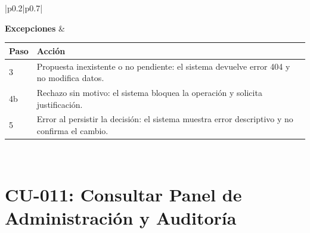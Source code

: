 \documentclass{report}
\newenvironment{usecasetable}{%
    \par\noindent
    \begin{longtable}{|p{0.2\textwidth}|p{0.7\textwidth}|}
    \hline
}{%
    \end{longtable}
    \newpage
}
\newenvironment{flowtable}[1]{%
    \begin{tabular}{|l|p{#1}|}
    \hline
    \textbf{Paso} & \textbf{Acción} \\
    \hline
}{%
    \end{tabular}
}
\begin{document}
\begin{usecasetable}
\hline
\textbf{Excepciones} &
\begin{flowtable}{}
3 & Propuesta inexistente o no pendiente: el sistema devuelve error 404 y no modifica datos. \\
4b & Rechazo sin motivo: el sistema bloquea la operación y solicita justificación. \\
5 & Error al persistir la decisión: el sistema muestra error descriptivo y no confirma el cambio. \\
\end{flowtable} \\
\hline
\end{usecasetable}

\section*{CU-011: Consultar Panel de Administración y Auditoría}
\end{document}
